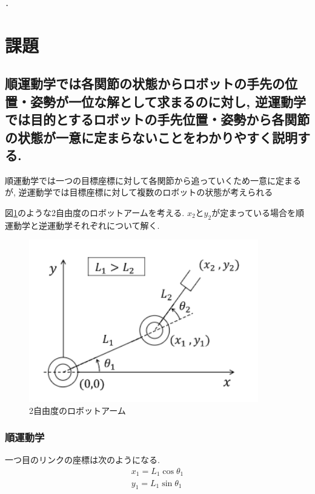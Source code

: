 \documentclass[a4paper,11pt]{jsarticle}
\begin{document}
\begin{multicols}{2}
\begin{lstlisting}[basicstyle=\ttfamily\footnotesize]
.
  \end{lstlisting}%
\end{multicols}

\section{課題}

\subsection{順運動学では各関節の状態からロボットの手先の位置・姿勢が一位な解として求まるのに対し,
逆運動学では目的とするロボットの手先位置・姿勢から各関節の状態が一意に定まらないことをわかりやすく説明する.}
順運動学では一つの目標座標に対して各関節から追っていくため一意に定まるが,
逆運動学では目標座標に対して複数のロボットの状態が考えられる

図\ref{アーム}のような2自由度のロボットアームを考える. $x_2$と$y_2$が定まっている場合を順運動学と逆運動学それぞれについて解く.

\begin{figure}[H]
  \begin{center}
    \includegraphics[width = 10cm]{画像/2自由度ロボットアーム.png}
    \caption{2自由度のロボットアーム}
    \label{アーム}
  \end{center}
\end{figure}

\subsubsection{順運動学}
一つ目のリンクの座標は次のようになる.
\begin{align}
  x_1=L_1\cos{\theta_1}\\
  y_1=L_1\sin{\theta_1}
\end{align}
\end{document}
